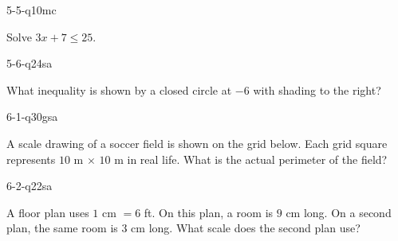 \begin{practiceQuestion}{5-5-q10}{mc}
\begin{questionText}
Solve $3x + 7 \leq 25$.
\end{questionText}
\end{practiceQuestion}

\begin{practiceQuestion}{5-6-q24}{sa}
\begin{questionText}
What inequality is shown by a closed circle at $-6$ with shading to the right?
\end{questionText}
\end{practiceQuestion}

\begin{practiceQuestion}{6-1-q30}{gsa}
\begin{questionText}
A scale drawing of a soccer field is shown on the grid below. Each grid square represents $10$ m $\times$ $10$ m in real life. What is the actual perimeter of the field?

\begin{center}
\end{center}
\end{questionText}
\end{practiceQuestion}

\begin{practiceQuestion}{6-2-q22}{sa}
\begin{questionText}
A floor plan uses $1$ cm $= 6$ ft. On this plan, a room is $9$ cm long. On a second plan, the same room is $3$ cm long. What scale does the second plan use?
\end{questionText}
\end{practiceQuestion}

